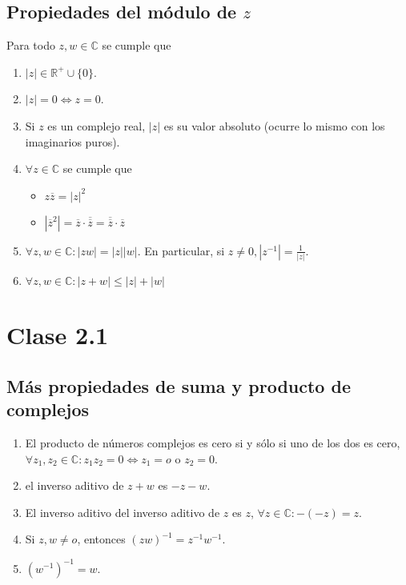 \documentclass{article}
\begin{document}
\subsection{Propiedades del módulo de $z$}
Para todo $z,w\in \mathbb{C}$ se cumple que
\begin{enumerate}
    \item $|z|\in \mathbb{R}^+\cup \{0\}$.
    \item $|z|=0 \Leftrightarrow z=0$.
    \item Si $z$ es un complejo real, $|z|$ es su valor absoluto (ocurre lo mismo con los imaginarios puros).
    \item $\forall z \in \mathbb{C}$ se cumple que
        \begin{itemize}
            \item $z\overline{z}=|z|^2$
            \item $|\overline{z}^2|=\overline{z}\cdot \overline{\overline{z}}=\overline{\overline{z}} \cdot \overline{z}$
        \end{itemize}
    \item $\forall z,w\in \mathbb{C}:|zw|=|z||w|$. En particular, si $z\ne 0, |z^{-1}|=\frac{1}{|z|}$.
    \item $\forall z,w\in \mathbb{C}: |z+w|\leq|z|+|w|$
\end{enumerate}

\section{Clase 2.1}
\subsection{Más propiedades de suma y producto de complejos}
\begin{enumerate}
    \item El producto de números complejos es cero si y sólo si uno de los dos es cero, $\forall z_1,z_2 \in \mathbb{C}: z_1z_2=0 \Leftrightarrow z_1=o$ o $z_2=0$.
    \item el inverso aditivo de $z+w$ es $-z-w$.
    
    \item El inverso aditivo del inverso aditivo de $z$ es $z$, $\forall z\in \mathbb{C}:-(-z)=z$.
    
    \item Si $z,w \ne o$, entonces $(zw)^{-1}=z^{-1}w^{-1}$.
    
    \item $(w^{-1})^{-1}=w$.
\end{enumerate}
\end{document}
